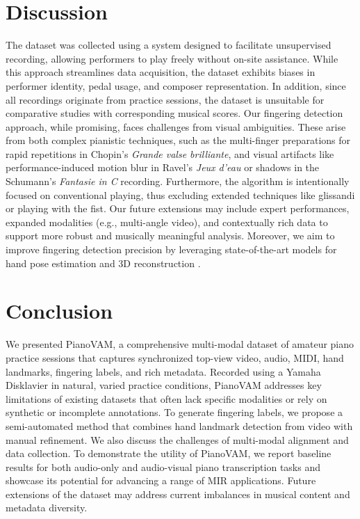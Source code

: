 \documentclass{article}
\begin{document}
\section{Discussion}\label{sec:discussion}
The dataset was collected using a system designed to facilitate unsupervised recording, allowing performers to play freely without on-site assistance. While this approach streamlines data acquisition, the dataset exhibits biases in performer identity, pedal usage, and composer representation. In addition, since all recordings originate from practice sessions, the dataset is unsuitable for comparative studies with corresponding musical scores. Our fingering detection approach, while promising, faces challenges from visual ambiguities. These arise from both complex pianistic techniques, such as the multi-finger preparations for rapid repetitions in Chopin's \textit{Grande valse brilliante}, and visual artifacts like performance-induced motion blur in Ravel's \textit{Jeux d'eau} or shadows in the Schumann's \textit{Fantasie in C} recording. Furthermore, the algorithm is intentionally focused on conventional playing, thus excluding extended techniques like glissandi or playing with the fist. Our future extensions may include expert performances, expanded modalities (e.g., multi-angle video), and contextually rich data to support more robust and musically meaningful analysis. Moreover, we aim to improve fingering detection precision by leveraging state-of-the-art models for hand pose estimation \cite{ViTPose++} and 3D reconstruction \cite{dong2024hamba}. %

\section{Conclusion}\label{sec:conclusion}
We presented PianoVAM, a comprehensive multi-modal dataset of amateur piano practice sessions that captures synchronized top-view video, audio, MIDI, hand landmarks, fingering labels, and rich metadata. Recorded using a Yamaha Disklavier in natural, varied practice conditions, PianoVAM addresses key limitations of existing datasets that often lack specific modalities or rely on synthetic or incomplete annotations. To generate fingering labels, we propose a semi-automated method that combines hand landmark detection from video with manual refinement. We also discuss the challenges of multi-modal alignment and data collection. To demonstrate the utility of PianoVAM, we report baseline results for both audio-only and audio-visual piano transcription tasks and showcase its potential for advancing a range of MIR applications. Future extensions of the dataset may address current imbalances in musical content and metadata diversity.
\end{document}
